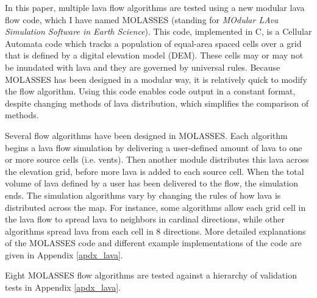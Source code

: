 	In this paper, multiple lava flow algorithms are tested using a new modular lava flow code, which I have named MOLASSES (standing for \textit{MOdular LAva Simulation Software in Earth Science}). This code, implemented in C, is a Cellular Automata code which tracks a population of equal-area spaced cells over a grid that is defined by a digital elevation model (DEM). These cells may or may not be inundated with lava and they are governed by universal rules. Because MOLASSES has been designed in a modular way, it is relatively quick to modify the flow algorithm. Using this code enables code output in a constant format, despite changing methods of lava distribution, which simplifies the comparison of methods.
	
	Several flow algorithms have been designed in MOLASSES. Each algorithm begins a lava flow simulation by delivering a user-defined amount of lava to one or more source cells (i.e. vents). Then another module distributes this lava across the elevation grid, before more lava is added to each source cell. When the total volume of lava defined by a user has been delivered to the flow, the simulation ends. The simulation algorithms vary by changing the rules of how lava is distributed across the map. For instance, some algorithms allow each grid cell in the lava flow to spread lava to neighbors in cardinal directions, while other algorithms spread lava from each cell in 8 directions. More detailed explanations of the MOLASSES code and different example implementations of the code are given in Appendix \ref{apdx_lava}.
	
	Eight MOLASSES flow algorithms are tested against a hierarchy of validation tests in Appendix \ref{apdx_lava}. %
	
	
	
	
